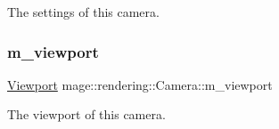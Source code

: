 The settings of this camera. \hypertarget{classmage_1_1rendering_1_1_camera_af01065cfadb5c8442bcc0f823254b09e}{}\label{classmage_1_1rendering_1_1_camera_af01065cfadb5c8442bcc0f823254b09e} 
\subsubsection{\texorpdfstring{m\+\_\+viewport}{m\_viewport}}
{\footnotesize\ttfamily \hyperlink{classmage_1_1rendering_1_1_viewport}{Viewport} mage\+::rendering\+::\+Camera\+::m\+\_\+viewport\hspace{0.3cm}{\ttfamily [private]}}

The viewport of this camera. 